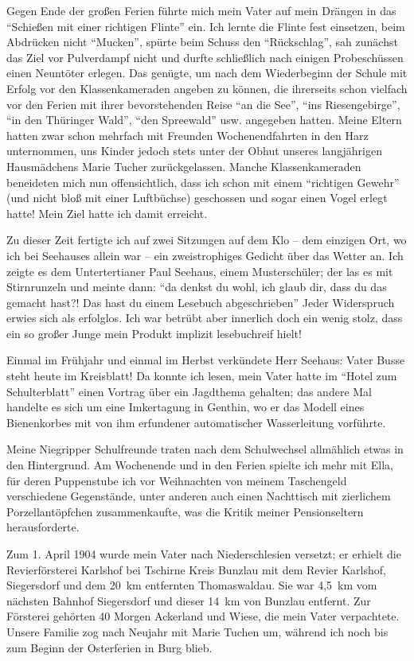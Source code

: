 \documentclass[a5paper,pagesize,10pt,twoside=true]{scrbook}
\begin{document}
Gegen Ende der großen Ferien führte mich mein Vater auf mein Drängen in das \enquote{Schießen mit einer richtigen Flinte} ein. Ich lernte die Flinte fest einsetzen, beim Abdrücken nicht \enquote{Mucken}, spürte beim Schuss den \enquote{Rückschlag}, sah zunächst das Ziel vor Pulverdampf nicht und durfte schließlich nach einigen Probeschüssen einen Neuntöter erlegen. Das genügte, um nach dem Wiederbeginn der Schule mit Erfolg vor den Klassenkameraden angeben zu können, die ihrerseits schon vielfach vor den Ferien mit ihrer bevorstehenden Reise \enquote{an die See}, \enquote{ins Riesengebirge}, \enquote{in den Thüringer Wald}, \enquote{den Spreewald} usw. angegeben hatten. Meine Eltern hatten zwar schon mehrfach mit Freunden Wochenendfahrten in den Harz unternommen, uns Kinder jedoch stets unter der Obhut unseres langjährigen Hausmädchens Marie Tucher zurückgelassen. Manche Klassenkameraden beneideten mich nun offensichtlich, dass ich schon mit einem \enquote{richtigen Gewehr} (und nicht bloß mit einer Luftbüchse) geschossen und sogar einen Vogel erlegt hatte! Mein Ziel hatte ich damit erreicht.

Zu dieser Zeit fertigte ich auf zwei Sitzungen auf dem Klo -- dem einzigen Ort, wo ich bei Seehauses allein war -- ein zweistrophiges Gedicht über das Wetter an. Ich zeigte es dem Untertertianer Paul Seehaus, einem Musterschüler; der las es mit Stirnrunzeln und meinte dann: \enquote{da denkst du wohl, ich glaub dir, dass du das gemacht hast?! Das hast du einem Lesebuch abgeschrieben} Jeder Widerspruch erwies sich als erfolglos. Ich war betrübt aber innerlich doch ein wenig stolz, dass ein so großer Junge mein Produkt implizit lesebuchreif hielt!

Einmal im Frühjahr und einmal im Herbst verkündete Herr Seehaus: Vater Busse steht heute im Kreisblatt! Da konnte ich lesen, mein Vater hatte im \enquote{Hotel zum Schulterblatt} einen Vortrag über ein Jagdthema gehalten; das andere Mal handelte es sich um eine Imkertagung in Genthin, wo er das Modell eines Bienenkorbes mit von ihm erfundener automatischer Wasserleitung vorführte.

Meine Niegripper Schulfreunde traten nach dem Schulwechsel allmählich etwas in den Hintergrund. Am Wochenende und in den Ferien spielte ich mehr mit Ella, für deren Puppenstube ich vor Weihnachten von meinem Taschengeld verschiedene Gegenstände, unter anderen auch einen Nachttisch mit zierlichem Porzellantöpfchen zusammenkaufte, was die Kritik meiner Pensionseltern herausforderte.

Zum 1. April 1904 wurde mein Vater nach Niederschlesien versetzt; er erhielt die Revierförsterei Karlshof bei Tschirne Kreis Bunzlau mit dem Revier Karlshof, Siegersdorf und dem 20~km entfernten Thomaswaldau. Sie war 4,5~km vom nächsten Bahnhof Siegersdorf und dieser 14~km von Bunzlau entfernt. Zur Försterei gehörten 40 Morgen Ackerland und Wiese, die mein Vater verpachtete. Unsere Familie zog nach Neujahr mit Marie Tuchen um, während ich noch bis zum Beginn der Osterferien in Burg blieb.
\end{document}

